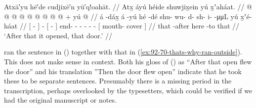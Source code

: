 \ex\label{ex:92-71-door-opened}%
%
\begingl
	\glpreamble	Atxā′yu hē′de cudjixē′n yū′q!oahāt. //
	\glpreamble	Atx̱ áyú héide shuwjix̱ein yú x̱ʼaháat. //
	\gla	{}  @ {} {}  @ {}
		{}  @ {} {}
		 @ {} @ {} @ {} @ {} @ {} @ {} +
		{} yú  @ {} {} //
	\glb	{} á -dáx̱ {} á -yú
		{} hé -dé {}
		shu- wu- d- sh- i-  -μμL
		{} yú x̱ʼé- háat {} //
	\glc	{}[  - {}]  -
		{}[  - {}]
		end- - - - -  -
		{}[  mouth- cover {}] //
	\gld	{} that -after {}  {}
		{} here -to {}
		 {} {} {} {} {} {}
		{} that  {} {} //
	\glft	‘After that it opened, that door.’
		//
\endgl
\xe

\citeauthor{swanton:1909} ran the sentence in (\lastx) together with that in (\ref{ex:92-70-thats-why-ran-outside}).
This does not make sense in context.
Both his gloss of (\lastx) as “After that open flew the door” and his translation ”Then the door flew open” indicate that he took these to be separate sentences.
Presumably there is a missing period in the transcription, perhaps overlooked by the typesetters, which could be verified if we had the original manuscript or notes.

